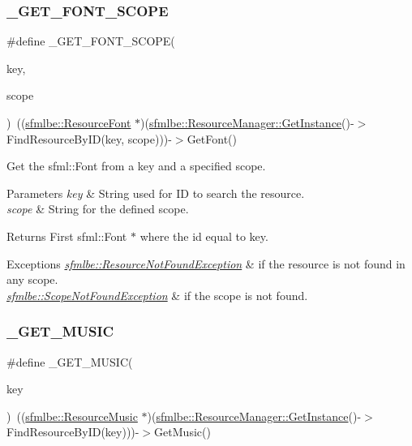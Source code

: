 \subsubsection{\texorpdfstring{\+\_\+\+G\+E\+T\+\_\+\+F\+O\+N\+T\+\_\+\+S\+C\+O\+PE}{\_GET\_FONT\_SCOPE}}
{\footnotesize\ttfamily \#define \+\_\+\+G\+E\+T\+\_\+\+F\+O\+N\+T\+\_\+\+S\+C\+O\+PE(\begin{DoxyParamCaption}\item[{}]{key,  }\item[{}]{scope }\end{DoxyParamCaption})~((\mbox{\hyperlink{classsfmlbe_1_1_resource_font}{sfmlbe\+::\+Resource\+Font}} $\ast$)(\mbox{\hyperlink{classsfmlbe_1_1_singleton_a313529b2a097425bf5500df8848ead3e}{sfmlbe\+::\+Resource\+Manager\+::\+Get\+Instance}}()-\/$>$Find\+Resource\+By\+ID(key, scope)))-\/$>$Get\+Font()}

Get the sfml\+::\+Font from a key and a specified scope. 
\begin{DoxyParams}{Parameters}
{\em key} & String used for ID to search the resource. \\
\hline
{\em scope} & String for the defined scope. \\
\hline
\end{DoxyParams}
\begin{DoxyReturn}{Returns}
First sfml\+::\+Font $\ast$ where the id equal to key. 
\end{DoxyReturn}

\begin{DoxyExceptions}{Exceptions}
{\em \mbox{\hyperlink{classsfmlbe_1_1_resource_not_found_exception}{sfmlbe\+::\+Resource\+Not\+Found\+Exception}}} & if the resource is not found in any scope. \\
\hline
{\em \mbox{\hyperlink{classsfmlbe_1_1_scope_not_found_exception}{sfmlbe\+::\+Scope\+Not\+Found\+Exception}}} & if the scope is not found. \\
\hline
\end{DoxyExceptions}
\mbox{\label{group___t_e_s_t___g_r_o_u_p_ga8d8081f0d0ad6f79d654778d16870bca}} 
\subsubsection{\texorpdfstring{\+\_\+\+G\+E\+T\+\_\+\+M\+U\+S\+IC}{\_GET\_MUSIC}}
{\footnotesize\ttfamily \#define \+\_\+\+G\+E\+T\+\_\+\+M\+U\+S\+IC(\begin{DoxyParamCaption}\item[{}]{key }\end{DoxyParamCaption})~((\mbox{\hyperlink{classsfmlbe_1_1_resource_music}{sfmlbe\+::\+Resource\+Music}} $\ast$)(\mbox{\hyperlink{classsfmlbe_1_1_singleton_a313529b2a097425bf5500df8848ead3e}{sfmlbe\+::\+Resource\+Manager\+::\+Get\+Instance}}()-\/$>$Find\+Resource\+By\+ID(key)))-\/$>$Get\+Music()}

